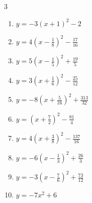 \begin{multicols}{3}
\begin{enumerate}
  \item $\displaystyle y=-3\left( x+1\right)^{2}-2$

        \phantom{$\displaystyle 頂点\left( -1 , -2 \right)$}

\columnbreak %

  \item $\displaystyle y=4\left( x-\frac{1}{8}\right)^{2}-\frac{17}{16}$


  \item $\displaystyle y=5\left( x-\frac{1}{5}\right)^{2}+\frac{19}{5}$


  \item $\displaystyle y=3\left( x+\frac{1}{6}\right)^{2}-\frac{25}{12}$


  \item $\displaystyle y=-8\left( x+\frac{5}{16}\right)^{2}+\frac{313}{32}$


  \item $\displaystyle y=\left( x+\frac{7}{2}\right)^{2}-\frac{81}{4}$


  \item $\displaystyle y=4\left( x+\frac{3}{8}\right)^{2}-\frac{137}{16}$


  \item $\displaystyle y=-6\left( x-\frac{1}{3}\right)^{2}+\frac{26}{3}$


  \item $\displaystyle y=-3\left( x-\frac{7}{6}\right)^{2}+\frac{73}{12}$


  \item $\displaystyle y=-7x^{2}+6$


\end{enumerate}
\end{multicols}
